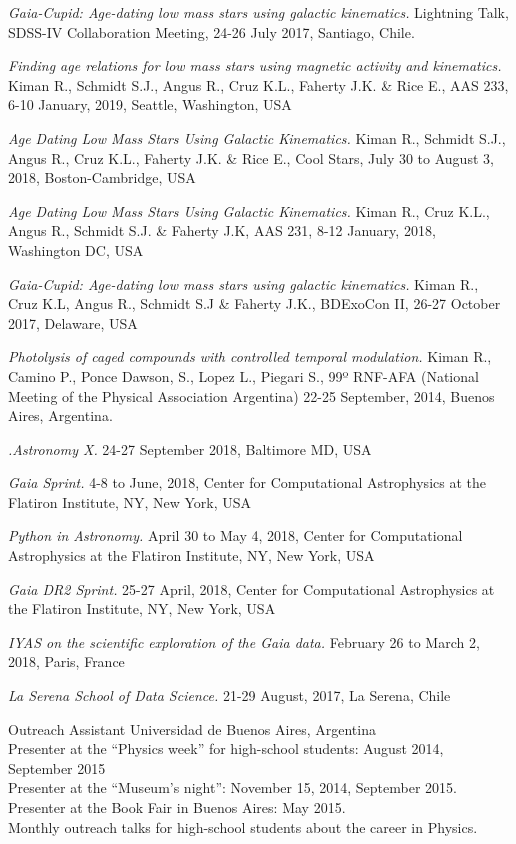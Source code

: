 \documentclass[10pt]{cv}
\newcommand\tab[1][1cm]{\hspace*{#1}}
\begin{document}
\begin{llist}
\textit{Gaia-Cupid: Age-dating low mass stars using galactic kinematics.} Lightning Talk, SDSS-IV Collaboration Meeting, 24-26 July 2017, Santiago, Chile. 


\textit{Finding age relations for low mass stars using magnetic activity and kinematics.} Kiman R., Schmidt S.J., Angus R., Cruz K.L., Faherty J.K. \& Rice E., AAS 233, 6-10 January, 2019, Seattle, Washington, USA

\textit{Age Dating Low Mass Stars Using Galactic Kinematics.} Kiman R., Schmidt S.J., Angus R., Cruz K.L., Faherty J.K. \& Rice E., Cool Stars, July 30 to August 3, 2018, Boston-Cambridge, USA

\textit{Age Dating Low Mass Stars Using Galactic Kinematics.} Kiman R., Cruz K.L., Angus R., Schmidt S.J. \& Faherty J.K, AAS 231, 8-12 January, 2018, Washington DC, USA 

\textit{Gaia-Cupid: Age-dating low mass stars using galactic kinematics.} Kiman R., Cruz K.L, Angus R., Schmidt S.J \& Faherty J.K., BDExoCon II, 26-27 October 2017, Delaware, USA 

\textit{Photolysis of caged compounds with controlled temporal modulation.} Kiman R., Camino P., Ponce Dawson, S., Lopez L., Piegari S., 99º RNF-AFA (National Meeting of the Physical Association Argentina) 22-25 September, 2014, Buenos Aires, Argentina.


\textit{.Astronomy X.} 24-27 September 2018, Baltimore MD, USA

\textit{Gaia Sprint.} 4-8 to June, 2018, Center for Computational Astrophysics at the Flatiron Institute, NY, New York, USA 

\textit{Python in Astronomy.}  April 30 to May 4, 2018, Center for Computational Astrophysics at the Flatiron Institute, NY, New York, USA 

\textit{Gaia DR2 Sprint.} 25-27 April, 2018, Center for Computational Astrophysics at the Flatiron Institute, NY, New York, USA 


\textit{IYAS on the scientific exploration of the Gaia data.} February 26 to March 2, 2018, Paris, France

\textit{La Serena School of Data Science.} 21-29 August, 2017, La Serena, Chile

Outreach Assistant
Universidad de Buenos Aires, Argentina\\
\tab Presenter at the ``Physics week'' for high-school students: August 2014, September 2015\\
\tab Presenter at the ``­Museum's night'':  November 15, 2014, September 2015.\\
\tab Presenter at the Book Fair in Buenos Aires: May 2015.\\
\tab Monthly outreach talks for high-school students about the career in Physics.


\end{llist}
\end{document}
